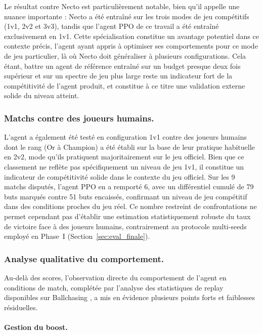 Le résultat contre Necto est particulièrement notable, bien qu'il appelle une nuance importante : Necto a été entraîné sur les trois modes de jeu compétitifs (1v1, 2v2 et 3v3), tandis que l'agent PPO de ce travail a été entraîné exclusivement en 1v1. Cette spécialisation constitue un avantage potentiel dans ce contexte précis, l'agent ayant appris à optimiser ses comportements pour ce mode de jeu particulier, là où Necto doit généraliser à plusieurs configurations. Cela étant, battre un agent de référence entraîné sur un budget presque deux fois supérieur et sur un spectre de jeu plus large reste un indicateur fort de la compétitivité de l'agent produit, et constitue à ce titre une validation externe solide du niveau atteint.

\subsubsection{Matchs contre des joueurs humains.}

L'agent a également été testé en configuration 1v1 contre des joueurs humains dont le rang (Or à Champion) a été établi sur la base de leur pratique habituelle en 2v2, mode qu'ils pratiquent majoritairement sur le jeu officiel. Bien que ce classement ne reflète pas spécifiquement un niveau de jeu 1v1, il constitue un indicateur de compétitivité solide dans le contexte du jeu officiel. Sur les 9 matchs disputés, l'agent PPO en a remporté 6, avec un différentiel cumulé de 79 buts marqués contre 51 buts encaissés, confirmant 
un niveau de jeu compétitif dans des conditions proches du jeu réel. Ce nombre restreint de confrontations ne permet cependant pas d'établir une estimation statistiquement robuste du taux de victoire face à des joueurs humains, contrairement au protocole multi-seeds employé en Phase~I (Section~\ref{sec:eval_finale}).

\subsubsection{Analyse qualitative du comportement.}

Au-delà des scores, l'observation directe du comportement de l'agent en conditions de match, complétée par l'analyse des statistiques de replay disponibles sur Ballchasing \parencite{BeepBoopV2Replays}, a mis en évidence plusieurs points forts et faiblesses résiduelles.

\paragraph{Gestion du boost.}

